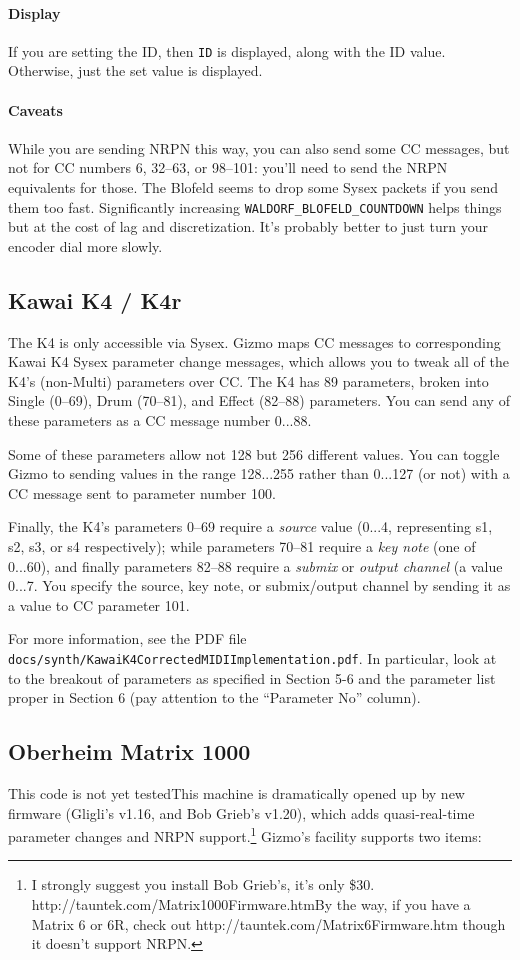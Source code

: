 \documentclass{article}
\begin{document}
\paragraph{Display}  If you are setting the ID, then \texttt{ID} is displayed, along with the ID value.  Otherwise, just the set value is displayed.

\paragraph{Caveats} While you are sending NRPN this way, you can also send some CC messages, but not for CC numbers 6, 32--63, or 98--101: you'll need to send the NRPN equivalents for those.  The Blofeld seems to drop some Sysex packets if you send them too fast.  Significantly increasing \texttt{WALDORF\_BLOFELD\_COUNTDOWN} helps things but at the cost of lag and discretization.  It's probably better to just turn your encoder dial more slowly.

\subsection{Kawai K4 / K4r}\quad The K4 is only accessible via Sysex.  Gizmo maps CC messages to corresponding Kawai K4 Sysex parameter change messages, which allows you to tweak all of the K4's (non-Multi) parameters over CC.  The K4 has 89 parameters, broken into Single (0--69), Drum (70--81), and Effect (82--88) parameters.  You can send any of these parameters as a CC message number 0...88.  

Some of these parameters allow not 128 but 256 different values.  You can toggle Gizmo to sending values in the range 128...255 rather than 0...127 (or not) with a CC message sent to parameter number 100.

Finally, the K4's parameters 0--69 require a {\it source} value (0...4, representing s1, s2, s3, or s4 respectively); while parameters 70--81 require a {\it key note} (one of 0...60), and finally parameters 82--88 require a {\it submix} or {\it output channel} (a value 0...7.  You specify the source, key note, or submix/output channel by sending it as a value to CC parameter 101.

For more information, see the PDF file \texttt{docs/synth/KawaiK4CorrectedMIDIImplementation.pdf}.  In particular, look at to the breakout of parameters as specified in Section 5-6 and the parameter list proper in Section 6 (pay attention to the ``Parameter No'' column). 

\subsection{Oberheim Matrix 1000}  {\color{red} This code is not yet tested}\quad This machine is dramatically opened up by new firmware (Gligli's v1.16, and Bob Grieb's v1.20), which adds quasi-real-time parameter changes and NRPN support.\footnote{I strongly suggest you install Bob Grieb's, it's only \$30.  http:/\!/tauntek.com/Matrix1000Firmware.htm\quad By the way, if you have a Matrix 6 or 6R, check out http:/\!/tauntek.com/Matrix6Firmware.htm though it doesn't support NRPN.}  Gizmo's facility supports two items:
\end{document}
